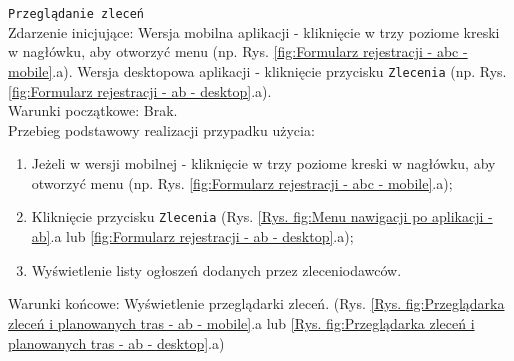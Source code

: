 \label{Przeglądanie zleceń}
\texttt{Przeglądanie zleceń} \\
Zdarzenie inicjujące: Wersja mobilna aplikacji - kliknięcie w trzy poziome kreski w nagłówku, aby otworzyć menu (np. Rys. \ref{fig:Formularz rejestracji - abc - mobile}.a). Wersja desktopowa aplikacji - kliknięcie przycisku \texttt{Zlecenia} (np. Rys. \ref{fig:Formularz rejestracji - ab - desktop}.a). \\
Warunki początkowe: Brak. \\
Przebieg podstawowy realizacji przypadku użycia:
\begin{enumerate}
    \item Jeżeli w wersji mobilnej - kliknięcie w trzy poziome kreski w nagłówku, aby otworzyć menu (np. Rys. \ref{fig:Formularz rejestracji - abc - mobile}.a);
    \item Kliknięcie przycisku \texttt{Zlecenia} (Rys. \ref{Rys. fig:Menu nawigacji po aplikacji - ab}.a lub \ref{fig:Formularz rejestracji - ab - desktop}.a);
    \item Wyświetlenie listy ogłoszeń dodanych przez zleceniodawców.
\end{enumerate}
Warunki końcowe: Wyświetlenie przeglądarki zleceń. (Rys. \ref{Rys. fig:Przeglądarka zleceń i planowanych tras - ab - mobile}.a lub \ref{Rys. fig:Przeglądarka zleceń i planowanych tras - ab - desktop}.a)
